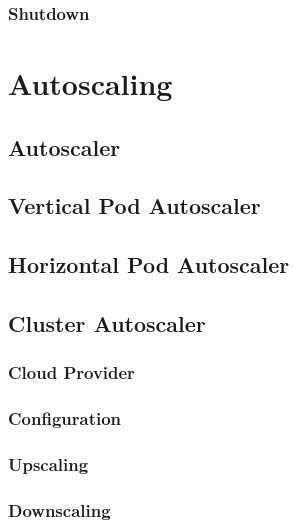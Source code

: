 \subsubsection{Shutdown}
\label{subsubsec:implementation_installer_services_shutdown}

\section{Autoscaling}
\label{sec:implementation_autoscaling}

\subsection{Autoscaler}
\label{subsec:implementation_autoscaling_autoscaler}

\subsection{Vertical Pod Autoscaler}
\label{subsec:implementation_autoscaling_vertical_pod_autoscaler}

\subsection{Horizontal Pod Autoscaler}
\label{subsec:implementation_autoscaling_horizontal_pod_autoscaler}

\subsection{Cluster Autoscaler}
\label{subsec:implementation_autoscaling_cluster_autoscaler}

\subsubsection{Cloud Provider}
\label{subsubsec:implementation_autoscaling_cluster_autoscaler_cloud_provider}

\subsubsection{Configuration}
\label{subsubsec:implementation_autoscaling_cluster_autoscaler_configuration}


\subsubsection{Upscaling}
\label{subsubsec:implementation_autoscaling_cluster_autoscaler_upscaling}

\subsubsection{Downscaling}
\label{subsubsec:implementation_autoscaling_cluster_autoscaler_downscaling}